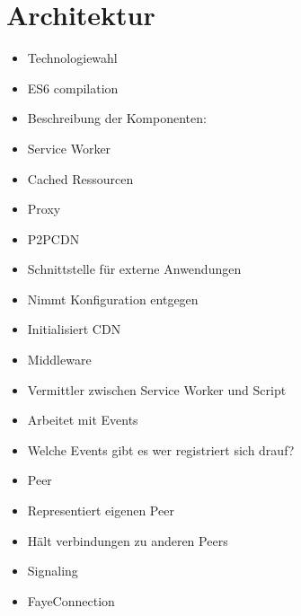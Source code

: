 %

\section{Architektur}

\begin{itemize}
  \item Technologiewahl
  \item ES6 compilation
  \item Beschreibung der Komponenten:
  \item Service Worker
  \item 	Cached Ressourcen
  \item 	Proxy
  \item P2PCDN
  \item 	Schnittstelle für externe Anwendungen
  \item 	Nimmt Konfiguration entgegen
  \item 	Initialisiert CDN
  \item Middleware
  \item 	Vermittler zwischen Service Worker und Script
  \item 	Arbeitet mit Events
  \item 	Welche Events gibt es wer registriert sich drauf?
  \item Peer
  \item 	Representiert eigenen Peer
  \item 	Hält verbindungen zu anderen Peers
  \item Signaling
  \item FayeConnection	
\end{itemize}

